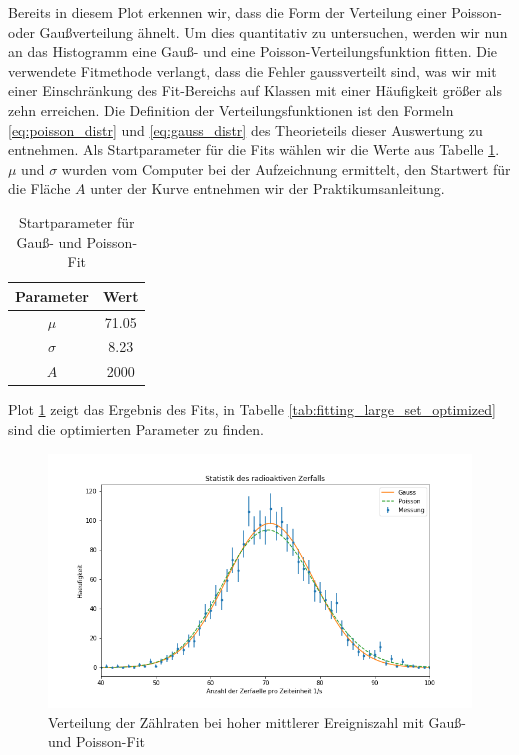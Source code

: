 Bereits in diesem Plot erkennen wir, dass die Form der Verteilung einer Poisson- oder Gaußverteilung ähnelt. Um dies quantitativ zu untersuchen, werden wir nun an das Histogramm eine Gauß- und eine Poisson-Verteilungsfunktion fitten. Die verwendete Fitmethode verlangt, dass die Fehler gaussverteilt sind, was wir mit einer Einschränkung des Fit-Bereichs auf Klassen mit einer Häufigkeit größer als zehn erreichen. Die Definition der Verteilungsfunktionen ist den Formeln \ref{eq:poisson_distr} und \ref{eq:gauss_distr} des Theorieteils dieser Auswertung zu entnehmen. Als Startparameter für die Fits wählen wir die Werte aus Tabelle \ref{tab:fitting_large_set_start_params}. $\mu$ und $\sigma$ wurden vom Computer bei der Aufzeichnung ermittelt, den Startwert für die Fläche $A$ unter der Kurve entnehmen wir der Praktikumsanleitung.

\renewcommand{\arraystretch}{1.3}
\begin{table}[H]
  \centering
  \begin{tabular}{c|c}
    Parameter & Wert\\\hline
    $\mu$ & 71.05\\
    $\sigma$ & 8.23\\
    $A$ & 2000
  \end{tabular}
  \caption{Startparameter für Gauß- und Poisson-Fit}
  \label{tab:fitting_large_set_start_params}
\end{table}
\renewcommand{\arraystretch}{1}

Plot \ref{plot:aufgabe4_gauss_poisson_fit} zeigt das Ergebnis des Fits, in Tabelle \ref{tab:fitting_large_set_optimized} sind die optimierten Parameter zu finden.

\begin{figure}[H]
  \centering
  \includegraphics[width=.9\textwidth]{files/aufgabe4_gauss_poisson_fit.png}
  \caption{Verteilung der Zählraten bei hoher mittlerer Ereigniszahl mit Gauß- und Poisson-Fit}
  \label{plot:aufgabe4_gauss_poisson_fit}
\end{figure}

